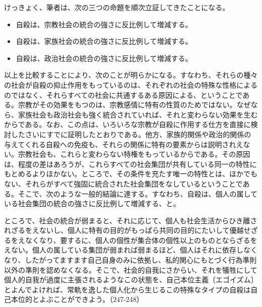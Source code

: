 けっきょく、筆者は、次の三つの命題を順次立証してきたことになる。


\begin{itemize}
\item[] 自殺は、宗教社会の統合の強さに反比例して増減する。

\item[] 自殺は、家族社会の統合の強さに反比例して増減する。

\item[] 自殺は、政治社会の統合の強さに反比例して増減する。

\end{itemize}

以上を比較することにより、次のことが明らかになる。すなわち、それらの種々の社会が自殺の抑止作用をもっているのは、それぞれの社会の特殊な性格によるのではなく、それらすべての社会に共通するある原因による、ということである。宗教がその効果をもつのは、宗教感情に特有の性質のためではない。なぜなら、家族社会も政治社会も強く統合されていれば、それと変わらない効果を生むからである。なお、この点は、いろいろな宗教が自殺に作用する仕方を直接に検討したさいにすでに証明したとおりである。他方、家族的関係や政治的関係の与えてくれる自殺への免疫も、それらの関係に特有の要素からは説明されえない。宗教社会も、これらと変わらない特権をもっているからである。その原因は、程度の差はあろうが、これらすべての社会集団が共有している同一の特性にもとめるよりほかない。ところで、その条件を充たす唯一の特性とは、ほかでもない、それらがすべて強固に統合された社会集団をなしているということである。そこで、次のような一般的結論に達する。すなわち、自殺は、個人の属している社会集団の統合の強さに反比例して増減する、と。


ところで、社会の統合が弱まると、それに応じて、個人も社会生活からひき離されざるをえないし、個人に特有の目的がもっぱら共同の目的にたいして優越せざるをえなくなり、要するに、個人の個性が集合体の個性以上のものとならざるをえない。個人の属している集団が弱まれば弱まるほど、個人はそれに依存しなくなり、したがってますます自己自身のみに依拠し、私的関心にもとづく行為準則以外の準則を認めなくなる。そこで、社会的自我にさからい、それを犠牲にして個人的自我が過度に主張されるようなこの状態を、自己本位主義〔エゴイズム〕とよんでよければ、常軌を逸した個人化から生じるこの特殊なタイプの自殺は自己本位的とよぶことができよう。（247-248）

\subsection{}



